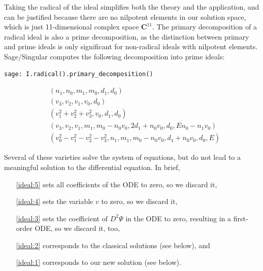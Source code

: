 \documentclass{article}
\begin{document}
Taking the radical of the ideal simplifies both the theory and the application,
and can be justified because there are no nilpotent elements in our solution
space, which is just 11-dimensional complex space ${\mathbf C}^{11}$.  The
primary decomposition of a radical ideal is also a prime decomposition,
as the distinction between primary and prime ideals is only significant
for non-radical ideals with nilpotent elements.  Sage/Singular computes
the following decomposition into prime ideals:

\begin{verbatim}
sage: I.radical().primary_decomposition()
\end{verbatim}

\begin{subequations}
\label{ideal}
\begin{align}
& \left(n_{1}, n_{0}, m_{1}, m_{0}, d_{1}, d_{0}\right)\label{ideal:5} \\
& \left(v_{3}, v_{2}, v_{1}, v_{0}, d_{0}\right)\label{ideal:4}\\
& \left(v_{1}^{2} + v_{2}^{2} + v_{3}^{2}, v_{0}, d_{1}, d_{0}\right)\label{ideal:3}\\
& \left(v_{3}, v_{2}, v_{1}, m_{1}, m_{0} - n_{0} v_{0}, 2 d_{1} + n_{0} v_{0}, d_{0}, E n_{0} - n_{1} v_{0}\right)\label{ideal:2}\\
& \left(v_{0}^{2} - v_{1}^{2} - v_{2}^{2} - v_{3}^{2}, n_{1}, m_{1}, m_{0} - n_{0} v_{0}, d_{1} + n_{0} v_{0}, d_{0}, E\right)\label{ideal:1}
\end{align}
\end{subequations}

Several of these varieties solve the system of equations, but do not lead to a meaningful solution to the differential equation.
In brief,

\begin{itemize}
\item[\eqref{ideal:5}] sets all coefficients of the ODE to zero, so we discard it,
\item[\eqref{ideal:4}] sets the variable $v$ to zero, so we discard it,
\item[\eqref{ideal:3}] sets the coefficient of
$D^2\Psi$
in the ODE to zero, resulting in a first-order ODE, so we discard it, too,
\item[\eqref{ideal:2}] corresponds to the classical solutions (see below), and
\item[\eqref{ideal:1}] corresponds to our new solution (see below).

\end{itemize}
\end{document}
